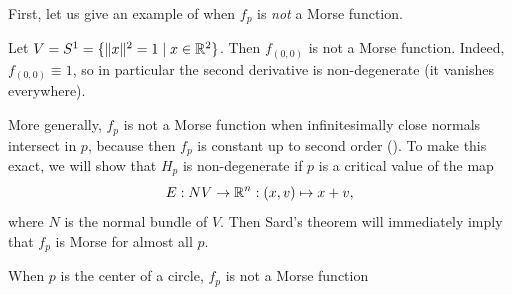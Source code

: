 First, let us give an example of when $f_p$ is \emph{not} a Morse function.

\begin{eg}
    Let $V = S^1 = \{\|x\|^2 = 1  \mid  x \in \mathbb{R}^2\} $.
    Then $f_{(0, 0)}$ is not a Morse function.
    Indeed, $f_{(0, 0)} \equiv 1$, so in particular the second derivative is non-degenerate (it vanishes everywhere).
\end{eg}


More generally, $f_p$ is not a Morse function when infinitesimally close normals intersect in $p$, because then $f_p$ is constant up to second order ().
To make this exact, we will show that $H_p$ is non-degenerate if $p$ is a critical value of the map
\[
    E: NV \to  \mathbb{R}^{n}: (x, v) \mapsto x + v
,\]
where $N$ is the normal bundle of $V$.
Then Sard's theorem will immediately imply that $f_p$ is Morse for almost all $p$.

\begin{figure}[H]
    \centering
    \label{fig:existence-of-morse-functions-normal-bundle-map}
\end{figure}
\begin{marginfigure}
    \centering
    \caption{When $p$ is the center of a circle, $f_p$ is not a Morse function}
    \label{fig:example-when-fp-is-not-a-morse-function}
\end{marginfigure}


